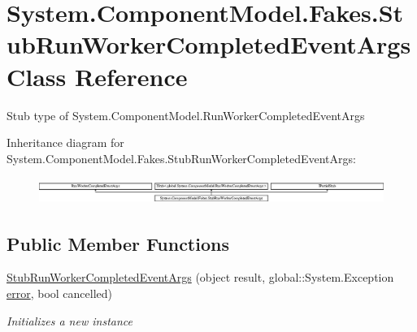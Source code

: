 \hypertarget{class_system_1_1_component_model_1_1_fakes_1_1_stub_run_worker_completed_event_args}{\section{System.\-Component\-Model.\-Fakes.\-Stub\-Run\-Worker\-Completed\-Event\-Args Class Reference}
\label{class_system_1_1_component_model_1_1_fakes_1_1_stub_run_worker_completed_event_args}
}


Stub type of System.\-Component\-Model.\-Run\-Worker\-Completed\-Event\-Args 


Inheritance diagram for System.\-Component\-Model.\-Fakes.\-Stub\-Run\-Worker\-Completed\-Event\-Args\-:\begin{figure}[H]
\begin{center}
\leavevmode
\includegraphics[height=0.854310cm]{class_system_1_1_component_model_1_1_fakes_1_1_stub_run_worker_completed_event_args}
\end{center}
\end{figure}
\subsection*{Public Member Functions}
\begin{DoxyCompactItemize}
\item 
\hyperlink{class_system_1_1_component_model_1_1_fakes_1_1_stub_run_worker_completed_event_args_aefbaa34a227612875a2f4776ced7350a}{Stub\-Run\-Worker\-Completed\-Event\-Args} (object result, global\-::\-System.\-Exception \hyperlink{jquery-1_810_82-vsdoc_8js_acd25716dc66c2c57df2fc97807ffbddf}{error}, bool cancelled)
\begin{DoxyCompactList}\small\item\em Initializes a new instance\end{DoxyCompactList}\end{DoxyCompactItemize}
